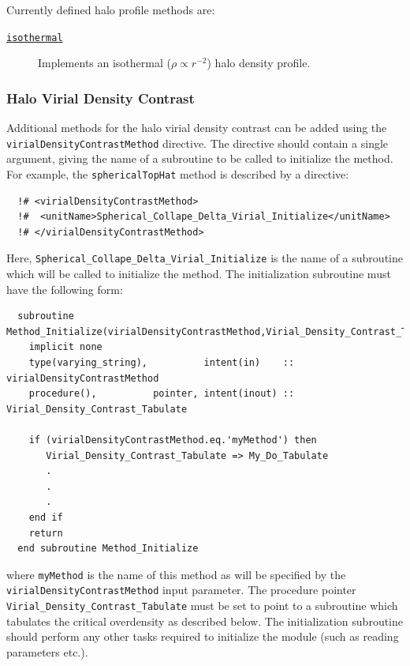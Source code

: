 Currently defined halo profile methods are:
\begin{description}
 \item [\hyperlink{dark_matter_profiles.isothermal.F90:dark_matter_profiles_isothermal:dark_matter_profile_isothermal_initialize}{{\tt isothermal}}] Implements an isothermal ($\rho \propto r^{-2}$) halo density profile.
\end{description}

\subsubsection{Halo Virial Density Contrast}

Additional methods for the halo virial density contrast can be added using the {\tt virialDensityContrastMethod} directive. The directive should contain a single argument, giving the name of a subroutine to be called to initialize the method. For example, the {\tt sphericalTopHat} method is described by a directive:
\begin{verbatim}
  !# <virialDensityContrastMethod>
  !#  <unitName>Spherical_Collape_Delta_Virial_Initialize</unitName>
  !# </virialDensityContrastMethod>
\end{verbatim}
Here, {\tt Spherical\_Collape\_Delta\_Virial\_Initialize} is the name of a subroutine which will be called to initialize the method. The initialization subroutine must have the following form:
\begin{verbatim}
  subroutine Method_Initialize(virialDensityContrastMethod,Virial_Density_Contrast_Tabulate)
    implicit none
    type(varying_string),          intent(in)    :: virialDensityContrastMethod
    procedure(),          pointer, intent(inout) :: Virial_Density_Contrast_Tabulate

    if (virialDensityContrastMethod.eq.'myMethod') then
       Virial_Density_Contrast_Tabulate => My_Do_Tabulate
       .
       .
       .
    end if
    return
  end subroutine Method_Initialize
\end{verbatim}
where {\tt myMethod} is the name of this method as will be specified by the {\tt virialDensityContrastMethod} input parameter. The procedure pointer {\tt Virial\_Density\_Contrast\_Tabulate} must be set to point to a subroutine which tabulates the critical overdensity as described below. The initialization subroutine should perform any other tasks required to initialize the module (such as reading parameters etc.).

